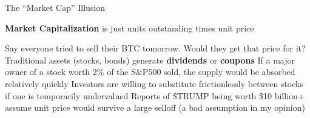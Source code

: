 \documentclass[aspectratio=169]{beamer}
\begin{document}
\begin{frame}{The ``Market Cap'' Illusion}

\textbf{Market Capitalization} is just units outstanding times unit price 

\bi 
\m Say everyone tried to sell their BTC tomorrow. Would they get that price for it? \pause 
\m Traditional assets (stocks, bonds) generate \textbf{dividends} or \textbf{coupons} 
\bi 
\m If a major owner of a stock worth 2\% of the S\&P500 sold, the supply would be absorbed relatively quickly 
\m Investors are willing to substitute frictionlessly between stocks if one is temporarily undervalued \pause 
\ei 
\m Reports of \$TRUMP being worth \$10 billion+ assume unit price would survive a large selloff (a bad assumption in my opinion) 
\ei 
    
\end{frame}
\end{document}
